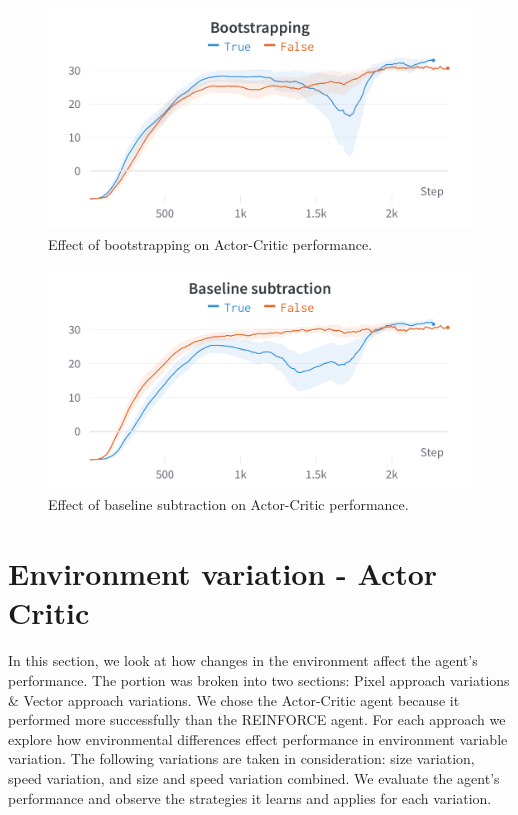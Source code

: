 \documentclass{article}
\begin{document}
\begin{figure}[htbp]
    \centering
    \includegraphics[width=\linewidth]{figs/bootstrap-R.png}
    \caption{Effect of bootstrapping on Actor-Critic performance.}
    \label{fig:bootstrap-r}
\end{figure}

\begin{figure}[htbp]
    \centering
    \includegraphics[width=\linewidth]{figs/baseline-R.png}
    \caption{Effect of baseline subtraction on Actor-Critic performance.}
    \label{fig:baselinesub-r}
\end{figure}

\section{Environment variation - Actor Critic}
\label{Environment}
In this section, we look at how changes in the environment affect the agent's performance. 
The portion was broken into two sections: Pixel approach variations \& Vector approach variations.
We chose the Actor-Critic agent because it performed more successfully than the REINFORCE agent.
For each approach we explore how environmental differences effect performance in environment variable variation. 
The following variations are taken in consideration: size variation, speed variation, and size and speed variation combined.
We evaluate the agent's performance and observe the strategies it learns and applies for each variation.
\end{document}
